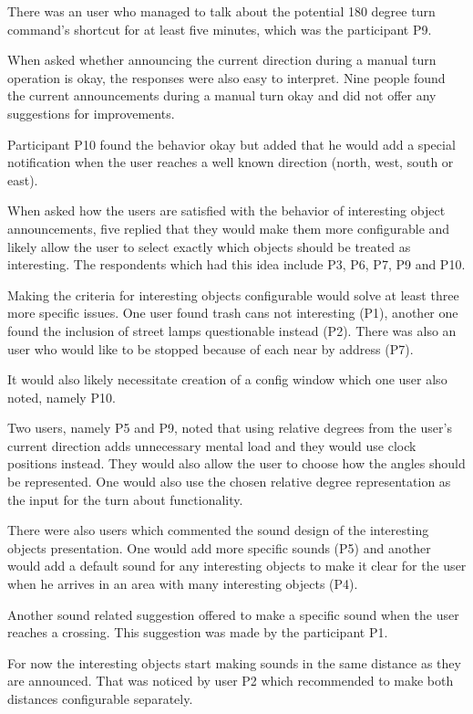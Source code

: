 \documentclass[nolof,digital]{fithesis3}
\begin{document}
There was an user who managed to talk about the potential 180 degree turn command's shortcut for at least five minutes, which was the participant P9.

When asked whether announcing the current direction during a manual turn operation is okay, the responses were also easy to interpret. Nine people found the current announcements during a manual turn okay and did not offer any suggestions for improvements.

Participant P10 found the behavior okay but added that he would add a special notification when the user reaches a well known direction (north, west, south or east).

When asked how the users are satisfied with the behavior of interesting object announcements, five replied that they would make them more configurable and likely allow the user to select exactly which objects should be treated as interesting. The respondents which had this idea include P3, P6, P7, P9 and P10.

Making the criteria for interesting objects configurable would solve at least three more specific issues. One user found trash cans not interesting (P1), another one found the inclusion of street lamps questionable instead (P2). There was also an user who would like to be stopped because of each near by address (P7).

It would also likely necessitate creation of a config window which one user also noted, namely P10.

Two users, namely  P5 and P9, noted that using relative degrees from the user's current direction adds unnecessary mental load and they would use clock positions instead. They would also allow the user to choose how the angles should be represented. One would also use the chosen relative degree representation as the input for the turn about functionality.

There were also users which commented the sound design of the interesting objects presentation. One would add more specific sounds (P5) and another would add a default sound for any interesting objects to make it clear for the user when he arrives in an area with many interesting objects (P4).

Another sound related suggestion offered to make a specific sound when the user reaches a crossing. This suggestion was made by the participant P1.

For now the interesting objects start making sounds in the same distance as they are announced. That was noticed by user P2 which recommended to make both distances configurable separately.
\end{document}
